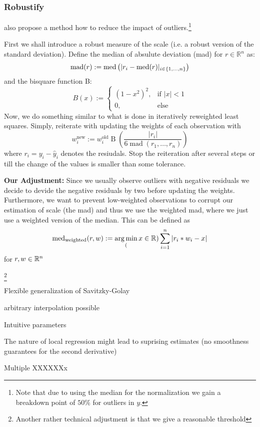 \subsubsection{Robustify}
\cite{clevelandRobustLocallyWeighted1979} also propose a method how to reduce the impact of outliers.\footnote{Note that due to using the median for the normalization we gain a breakdown point of $50 \%$ for outliers in $y$.}

First we shall introduce a robust measure of the scale (i.e. a robust version of the standard deviation). Define the median of absulute deviation (mad) for $r\in\mathbb R^n$ as:
\begin{equation}
  \operatorname{mad}(r) := \operatorname{med}\left(|r_i - \operatorname{med}(r)|_{i\in \{1,\dots,n\}}\right)
\end{equation}
and the bisquare function B:
$$
  B(x):=\begin{cases}
    \left(1-x^{2}\right)^{2}, & \text{if } |x|<1 \\
    0,                        & \text{else }
  \end{cases}
$$
Now, we do something similar to what is done in iteratively reweighted least squares. Simply, reiterate with updating the weights of each observation with
\begin{equation}
  w_i^\text{new}:=w_i^\text{old} \operatorname{B}\left(\frac{|r_i|}{6\operatorname{mad}\left(r_1,\dots,r_n\right)}\right)
  \label{eq:bisquare}
\end{equation}
where $r_i = y_i - \hat y_i$ denotes the resiudals. Stop the reiteration after several steps or till the change of the values is smaller than some tolerance.

\textbf{Our Adjustment:} Since we usually observe outliers with negative residuals we decide to devide the negative residuals by two before updating the weights. Furthermore, we want to prevent low-weighted observations to corrupt our estimation of scale (the mad) and thus we use the weighted mad, where we just use a weighted version of the median. This can be defined as
$$
  \operatorname{med}_\text{weighted}(r,w) := \operatorname*{arg\, min}_(x \in \mathbb{R}) \sum_{i=1}^n |r_i*w_i -x|
$$
for $r,w\in \mathbb{R}^n$

\footnote{Another rather technical adjustment is that we give a reasonable threshold}



\begin{my_pros_cons_table}{
    \item Flexible generalization of Savitzky-Golay
    \item arbitrary interpolation possible
    \item Intuitive parameters
  }{
    \item The nature of local regression might lead to suprising estimates (no smoothness guarantees for the second derivative)
    \item Multiple XXXXXXx
  }
\end{my_pros_cons_table}

